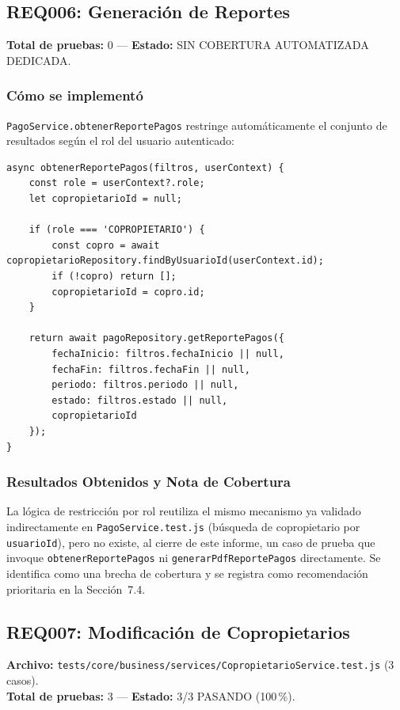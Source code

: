 \documentclass[12pt,a4paper]{article}
\begin{document}
\subsection{REQ006: Generación de Reportes}
\textbf{Total de pruebas:} 0 — \textbf{Estado:} SIN COBERTURA AUTOMATIZADA DEDICADA.

\subsubsection*{Cómo se implementó}

\texttt{PagoService.obtenerReportePagos} restringe automáticamente el conjunto de
resultados según el rol del usuario autenticado:

\begin{lstlisting}[caption={Restricción de reportes por rol (\texttt{src/core/business/services/PagoService.js})}]
async obtenerReportePagos(filtros, userContext) {
    const role = userContext?.role;
    let copropietarioId = null;

    if (role === 'COPROPIETARIO') {
        const copro = await copropietarioRepository.findByUsuarioId(userContext.id);
        if (!copro) return [];
        copropietarioId = copro.id;
    }

    return await pagoRepository.getReportePagos({
        fechaInicio: filtros.fechaInicio || null,
        fechaFin: filtros.fechaFin || null,
        periodo: filtros.periodo || null,
        estado: filtros.estado || null,
        copropietarioId
    });
}
\end{lstlisting}

\subsubsection*{Resultados Obtenidos y Nota de Cobertura}
La lógica de restricción por rol reutiliza el mismo mecanismo ya validado indirectamente
en \texttt{PagoService.test.js} (búsqueda de copropietario por \texttt{usuarioId}), pero no
existe, al cierre de este informe, un caso de prueba que invoque
\texttt{obtenerReportePagos} ni \texttt{generarPdfReportePagos} directamente. Se identifica
como una brecha de cobertura y se registra como recomendación prioritaria en la
Sección~7.4.

\subsection{REQ007: Modificación de Copropietarios}
\textbf{Archivo:} \texttt{tests/core/business/services/CopropietarioService.test.js}
(3 casos).\\
\textbf{Total de pruebas:} 3 — \textbf{Estado:} 3/3 PASANDO (100\,\%).
\end{document}
